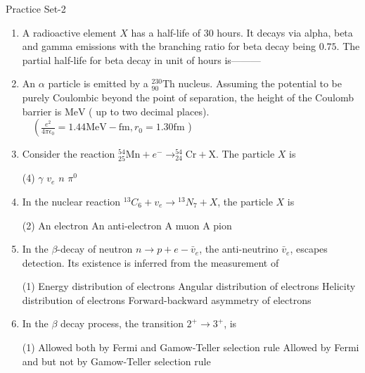 \newpage
\begin{abox}
	Practice Set-2
\end{abox}
\begin{enumerate}
	\item A radioactive element $X$ has a half-life of 30 hours. It decays via alpha, beta and gamma emissions with the branching ratio for beta decay being $0.75$. The partial half-life for beta decay in unit of hours is---------
	{}
	\item An $\alpha$ particle is emitted by a ${ }_{90}^{230} \mathrm{Th}$ nucleus. Assuming the potential to be purely Coulombic beyond the point of separation, the height of the Coulomb barrier is
	$\mathrm{MeV}$ ( up to two decimal places). $\quad\left(\frac{e^2}{4 \pi \epsilon_0}=1.44 \mathrm{MeV}-\mathrm{fm}, r_0=1.30 \mathrm{fm}\right.$ )
	{}
	\item Consider the reaction ${ }_{25}^{54} \mathrm{Mn}+e^{-} \rightarrow_{24}^{54} \mathrm{Cr}+\mathrm{X}$. The particle $X$ is
	{}
	 \begin{tasks}(4)
		\task[\textbf{a.}]$\gamma$
		\task[\textbf{b.}]$v_e$
		\task[\textbf{c.}]$n$
		\task[\textbf{d.}]$\pi^0$ 
	\end{tasks}
	\item In the nuclear reaction ${ }^{13} C_6+v_e \rightarrow{ }^{13} N_7+X$, the particle $X$ is
	{}
	 \begin{tasks}(2)
		\task[\textbf{a.}]An electron
		\task[\textbf{b.}]An anti-electron
		\task[\textbf{c.}]A muon
		\task[\textbf{d.}]A pion 
	\end{tasks}
	\item In the $\beta$-decay of neutron $n \rightarrow p+e-\bar{v}_e$, the anti-neutrino $\bar{v}_e$, escapes detection. Its existence is inferred from the measurement of
	{}
	 \begin{tasks}(1)
		\task[\textbf{a.}]Energy distribution of electrons
		\task[\textbf{b.}]Angular distribution of electrons
		\task[\textbf{c.}]Helicity distribution of electrons
		\task[\textbf{d.}]Forward-backward asymmetry of electrons 
	\end{tasks}
	\item In the $\beta$ decay process, the transition $2^{+} \rightarrow 3^{+}$, is
	{}
	 \begin{tasks}(1)
		\task[\textbf{a.}]Allowed both by Fermi and Gamow-Teller selection rule
		\task[\textbf{b.}] Allowed by Fermi and but not by Gamow-Teller selection rule

\end{tasks}
\end{enumerate}
